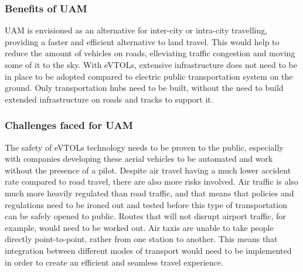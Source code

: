 

\subsubsection{Benefits of UAM}

\Gls{UAM} is envisioned as an alternative for inter-city or intra-city travelling, providing a faster and efficient alternative to land travel. 
This would help to reduce the amount of vehicles on roads, elleviating traffic congestion and moving some of it to the sky. 
With \glspl{eVTOL}, extensive infrastructure does not need to be in place to be adopted compared to electric public transportation system on the ground. 
Only transportation hubs need to be built, without the need to build extended infrastructure on roads and tracks to support it. 
\cite{arbin2021uam}

\subsubsection{Challenges faced for UAM}

The safety of \glspl{eVTOL} technology needs to be proven to the public, especially with companies developing these aerial vehicles to be automated and work without the presence of a pilot.
Despite air travel having a much lower accident rate compared to road travel, there are also more risks involved. 
Air traffic is also much more heavily regulated than road traffic, and that means that policies and regulations need to be ironed out and tested before this type of transportation can be safely opened to public.
Routes that will not disrupt airport traffic, for example, would need to be worked out.
Air taxis are unable to take people directly point-to-point, rather from one station to another.
This means that integration between different modes of transport would need to be implemented in order to create an efficient and seamless travel experience.
\cite{arbin2021uam}



